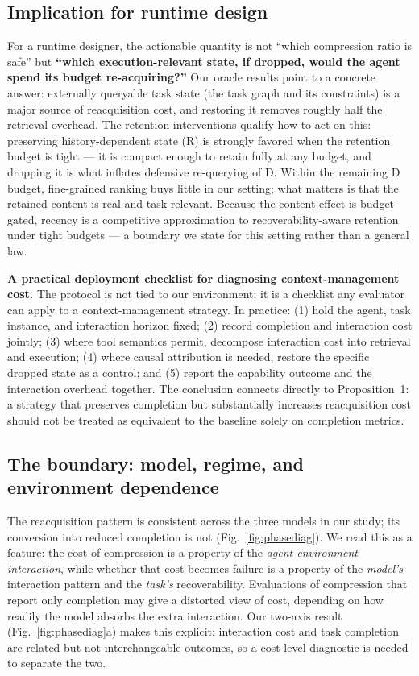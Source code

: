 \documentclass[11pt]{article}
\begin{document}
\subsection{Implication for runtime design}

For a runtime designer, the actionable quantity is not ``which compression ratio is safe''
but \textbf{``which execution-relevant state, if dropped, would the agent spend its budget
re-acquiring?''} Our oracle results point to a concrete answer: externally queryable task
state (the task graph and its constraints) is a major source of reacquisition cost, and
restoring it removes roughly half the retrieval overhead. The retention interventions
qualify how to act on this: preserving history-dependent state (R) is strongly favored
when the retention budget is tight --- it is compact enough to retain fully at any budget,
and dropping it is what inflates defensive re-querying of D. Within the remaining D
budget, fine-grained ranking buys little in our setting; what matters is that the
retained content is real and task-relevant. Because the content effect is budget-gated,
recency is a competitive approximation to recoverability-aware retention under tight
budgets --- a boundary we state for this setting rather than a general law.

\textbf{A practical deployment checklist for diagnosing context-management cost.} The protocol
is not tied to our environment; it is a checklist any evaluator can apply to a
context-management strategy. In practice: (1) hold the agent, task instance, and
interaction horizon fixed; (2) record completion and interaction cost jointly; (3) where
tool semantics permit, decompose interaction cost into retrieval and execution; (4) where
causal attribution is needed, restore the specific dropped state as a control; and (5)
report the capability outcome and the interaction overhead together. The conclusion
connects directly to Proposition~1: a strategy that preserves completion but
substantially increases reacquisition cost should not be treated as equivalent to the
baseline solely on completion metrics.

\subsection{The boundary: model, regime, and environment dependence}

The reacquisition pattern is consistent across the three models in our study; its
conversion into reduced completion is not (Fig.~\ref{fig:phasediag}). We read this as a feature: the cost
of compression is a property of the \emph{agent-environment interaction}, while whether that
cost becomes failure is a property of the \emph{model's} interaction pattern and the \emph{task's}
recoverability. Evaluations of compression that report only completion may give a distorted view of cost, depending on how readily the model absorbs the extra
interaction. Our
two-axis result (Fig.~\ref{fig:phasediag}a) makes this explicit: interaction cost and task completion are
related but not interchangeable outcomes, so a cost-level diagnostic is needed to
separate the two.
\end{document}
